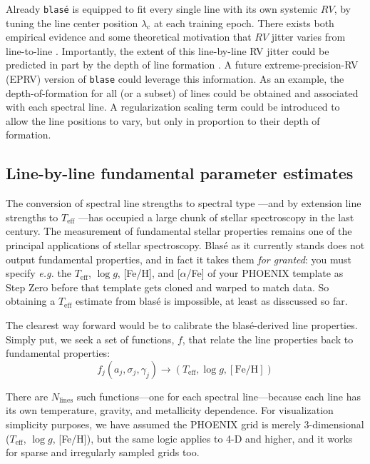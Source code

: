 \documentclass[twocolumn]{aastex631}
\begin{document}
Already \texttt{blas\'e} is equipped to fit every single line with its own systemic $RV$, by tuning the line center position $\lambda_\mathrm{c}$ at each training epoch.  There exists both empirical evidence and some theoretical motivation that $RV$ jitter varies from line-to-line \citep{2018A&A...620A..47D}.  Importantly, the extent of this line-by-line RV jitter could be predicted in part by the depth of line formation \citep{2021A&A...653A..43C, 2022A&A...664A..34A}.  A future extreme-precision-RV (EPRV) version of \texttt{blase} could leverage this information.  As an example, the depth-of-formation for all (or a subset) of lines could be obtained and associated with each spectral line.  A regularization scaling term could be introduced to allow the line positions to vary, but only in proportion to their depth of formation.

\subsection{Line-by-line fundamental parameter estimates}
The conversion of spectral line strengths to spectral type \citep{1901AnHar..28..129C}---and by extension line strengths to $T_\mathrm{eff}$ \citep{1925PhDT.........1P}---has occupied a large chunk of stellar spectroscopy in the last century.  The measurement of fundamental stellar properties remains one of the principal applications of stellar spectroscopy.  Blas\'e as it currently stands does not output fundamental properties, and in fact it takes them \emph{for granted}: you must specify \emph{e.g.} the $T_\mathrm{eff}$, $\log{g}$, [Fe/H], and [$\alpha$/Fe] of your PHOENIX template as Step Zero before that template gets cloned and warped to match data.  So obtaining a $T_\mathrm{eff}$ estimate from blas\'e is impossible, at least as disscussed so far.

The clearest way forward would be to calibrate the blas\'e-derived line properties.  Simply put, we seek a set of functions, $f$, that relate the line properties back to fundamental properties:
$$f_j(a_j, \sigma_j, \gamma_j) \to (T_\mathrm{eff}, \log{g}, [\mathrm{Fe}/\mathrm{H}])$$

There are $N_{\mathrm{lines}}$ such functions---one for each spectral line---because each line has its own temperature, gravity, and metallicity dependence.  For visualization simplicity purposes, we have assumed the PHOENIX grid is merely 3-dimensional ($T_\mathrm{eff}$, $\log{g}$, [Fe/H]), but the same logic applies to 4-D and higher, and it works for sparse and irregularly sampled grids too.
\end{document}

